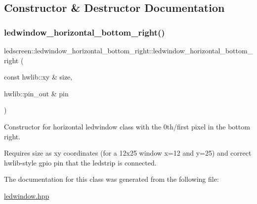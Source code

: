 \subsection{Constructor \& Destructor Documentation}
\mbox{\label{classledscreen_1_1ledwindow__horizontal__bottom__right_a19462b2c6d50c4e254025956d846a845}} 
\subsubsection{\texorpdfstring{ledwindow\+\_\+horizontal\+\_\+bottom\+\_\+right()}{ledwindow\_horizontal\_bottom\_right()}}
{\footnotesize\ttfamily ledscreen\+::ledwindow\+\_\+horizontal\+\_\+bottom\+\_\+right\+::ledwindow\+\_\+horizontal\+\_\+bottom\+\_\+right (\begin{DoxyParamCaption}\item[{const hwlib\+::xy \&}]{size,  }\item[{hwlib\+::pin\+\_\+out \&}]{pin }\end{DoxyParamCaption})\hspace{0.3cm}{\ttfamily [inline]}}



Constructor for horizontal ledwindow class with the 0th/first pixel in the bottom right. 

Requires size as xy coordinates (for a 12x25 window x=12 and y=25) and correct hwlib-\/style gpio pin that the ledstrip is connected. 

The documentation for this class was generated from the following file\+:\begin{DoxyCompactItemize}
\item 
\hyperlink{ledwindow_8hpp}{ledwindow.\+hpp}\end{DoxyCompactItemize}
